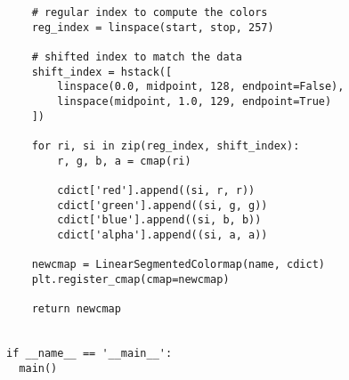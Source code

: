 \begin{lstlisting}
    # regular index to compute the colors
    reg_index = linspace(start, stop, 257)

    # shifted index to match the data
    shift_index = hstack([
        linspace(0.0, midpoint, 128, endpoint=False), 
        linspace(midpoint, 1.0, 129, endpoint=True)
    ])

    for ri, si in zip(reg_index, shift_index):
        r, g, b, a = cmap(ri)

        cdict['red'].append((si, r, r))
        cdict['green'].append((si, g, g))
        cdict['blue'].append((si, b, b))
        cdict['alpha'].append((si, a, a))

    newcmap = LinearSegmentedColormap(name, cdict)
    plt.register_cmap(cmap=newcmap)

    return newcmap


if __name__ == '__main__':
  main()
\end{lstlisting}
